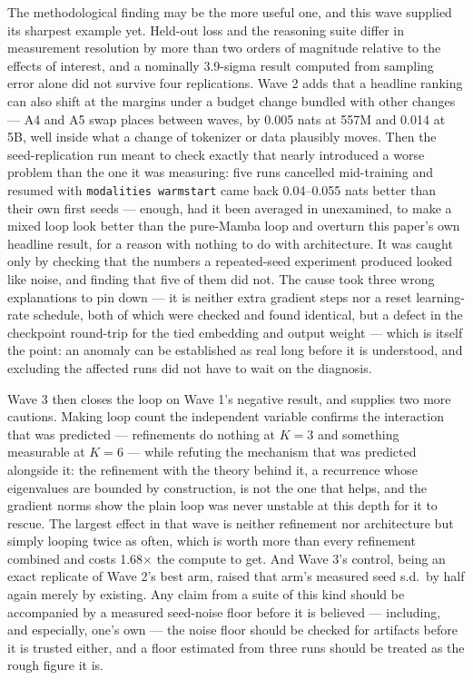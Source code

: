 \documentclass[11pt,a4paper]{article}
\begin{document}
The methodological finding may be the more useful one, and this wave supplied its sharpest example
yet. Held-out loss and the reasoning suite differ in measurement resolution by more than two orders
of magnitude relative to the effects of interest, and a nominally 3.9-sigma result computed from
sampling error alone did not survive four replications. Wave 2 adds that a headline ranking can also
shift at the margins under a budget change bundled with other changes --- A4 and A5 swap places
between waves, by 0.005 nats at 557M and 0.014 at 5B, well inside what a change of tokenizer or data
plausibly moves. Then the seed-replication run meant to check exactly that nearly introduced a worse
problem than the one it was measuring: five runs cancelled mid-training and resumed with
\texttt{modalities warmstart} came back 0.04--0.055 nats better than their own first seeds --- enough,
had it been averaged in unexamined, to make a mixed loop look better than the pure-Mamba loop and
overturn this paper's own headline result, for a reason with nothing to do with architecture. It was
caught only by checking that the numbers a repeated-seed experiment produced looked like noise, and
finding that five of them did not. The cause took three wrong explanations to pin down --- it is
neither extra gradient steps nor a reset learning-rate schedule, both of which were checked and
found identical, but a defect in the checkpoint round-trip for the tied embedding and output weight
--- which is itself the point: an anomaly can be established as real long before it is understood,
and excluding the affected runs did not have to wait on the diagnosis.

Wave 3 then closes the loop on Wave 1's negative result, and supplies two more cautions. Making loop
count the independent variable confirms the interaction that was predicted --- refinements do
nothing at $K{=}3$ and something measurable at $K{=}6$ --- while refuting the mechanism that was
predicted alongside it: the refinement with the theory behind it, a recurrence whose eigenvalues are
bounded by construction, is not the one that helps, and the gradient norms show the plain loop was
never unstable at this depth for it to rescue. The largest effect in that wave is neither refinement
nor architecture but simply looping twice as often, which is worth more than every refinement
combined and costs 1.68$\times$ the compute to get. And Wave 3's control, being an exact replicate of
Wave 2's best arm, raised that arm's measured seed s.d.\ by half again merely by existing. Any claim
from a suite of this kind should be accompanied by a measured seed-noise floor before it is believed
--- including, and especially, one's own --- the noise floor should be checked for artifacts before
it is trusted either, and a floor estimated from three runs should be treated as the rough figure it
is.
\end{document}
